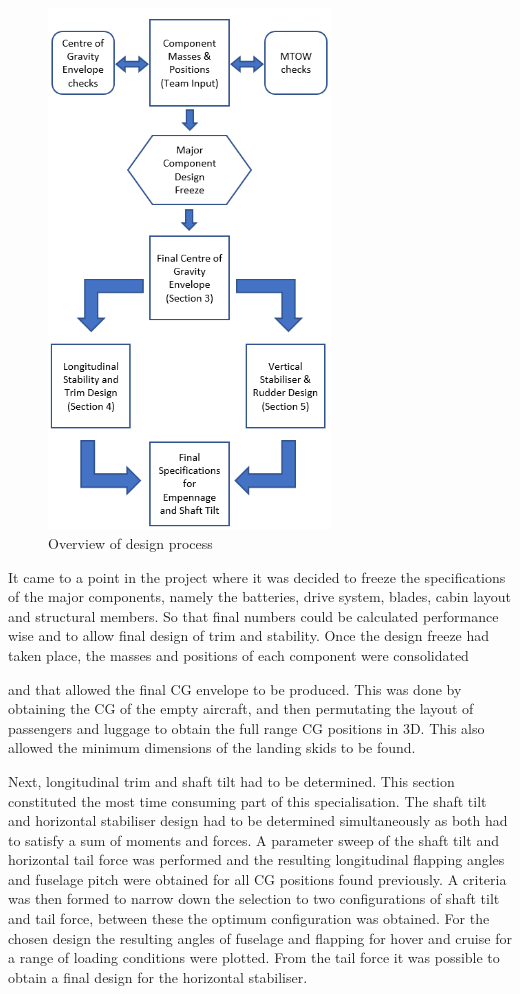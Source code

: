 \documentclass[11pt,a4paper]{article}
\begin{document}
\begin{figure}
\begin{center}
    \includegraphics[width=7.5cm]{Flowchart2.PNG}
\end{center}
    \caption{Overview of design process}
    \label{fig:flow}
\end{figure}
It came to a point in the project where it was decided to freeze the specifications of the major components, namely the batteries, drive system, blades, cabin layout and structural members. So that final numbers could be calculated performance wise and to allow final design of trim and stability.
Once the design freeze had taken place, the masses and positions of each component were consolidated 

and that allowed the final CG envelope to be produced. This was done by obtaining the CG of the empty aircraft, and then permutating the layout of passengers and luggage to obtain the full range CG positions in 3D. This also allowed the minimum dimensions of the landing skids to be found. 

Next, longitudinal trim and shaft tilt had to be determined. This section constituted the most time consuming part of this specialisation. The shaft tilt and horizontal stabiliser design had to be determined simultaneously as both had to satisfy a sum of moments and forces. A parameter sweep of the shaft tilt and horizontal tail force was performed and the resulting longitudinal flapping angles and fuselage pitch were obtained for all CG positions found previously. A criteria was then formed to narrow down the selection to two configurations of shaft tilt and tail force, between these the optimum configuration was obtained. For the chosen design the resulting angles of fuselage and flapping for hover and cruise for a range of loading conditions were plotted. From the tail force it was possible to obtain a final design for the horizontal stabiliser.
\end{document}
